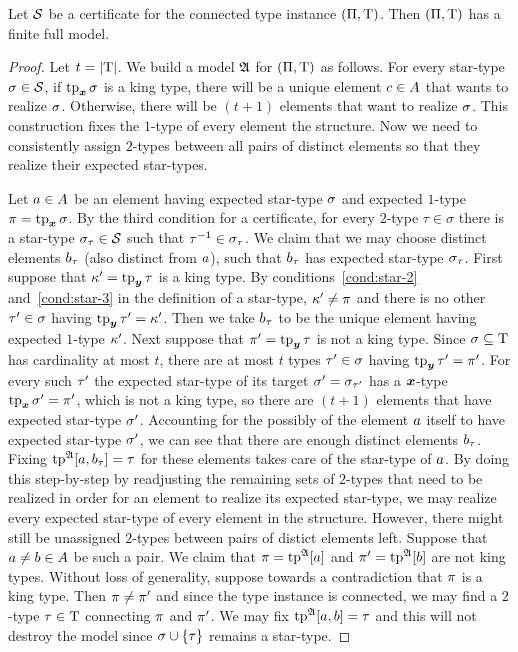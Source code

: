 \begin{lemma}\label{lem:cert-expand}
Let $\mathcal{S}$ be a certificate for the connected type instance $(\Pi,\mathrm{T})$.
Then $(\Pi,\mathrm{T})$ has a finite full model.
\end{lemma}
\begin{proof}
Let $t = \left|\mathrm{T}\right|$.
We build a model $\mathfrak{A}$ for $(\Pi,\mathrm{T})$ as follows. For every star-type
$\sigma \in \mathcal{S}$, if $\operatorname{tp}_{\bm{x}}\sigma$ is a king type, there will be a unique element
$c \in A$ that wants to realize $\sigma$. Otherwise, there will be
$(t+1)$ elements that want to realize $\sigma$.
This construction fixes the $1$-type of every element the structure. 
Now we need to consistently assign $2$-types between all pairs of distinct
elements so that they realize their expected star-types.

Let $a \in A$ be an element having expected star-type $\sigma$ and
expected $1$-type $\pi = \operatorname{tp}_{\bm{x}}\sigma$.
By the third condition for a certificate, for every $2$-type $\tau \in \sigma$
there is a star-type $\sigma_\tau \in \mathcal{S}$ such that $\tau^{-1} \in \sigma_\tau$.
We claim that we may choose distinct elements $b_\tau$ (also distinct from
$a$), such that $b_\tau$ has expected star-type $\sigma_\tau$.
First suppose that ${\kappa'} = \operatorname{tp}_{\bm{y}}\tau$ is a king type.
By conditions~\ref{cond:star-2} and~\ref{cond:star-3} in the definition of a
star-type, ${\kappa'} \neq \pi$ and there is no other ${\tau'} \in \sigma$ having
$\operatorname{tp}_{\bm{y}}{\tau'} = {\kappa'}$. Then we take $b_\tau$ to be the unique element having
expected $1$-type ${\kappa'}$.
Next suppose that ${\pi'} = \operatorname{tp}_{\bm{y}}\tau$ is not a king type.
Since $\sigma \subseteq \mathrm{T}$ has cardinality at most $t$, there are at most $t$
types ${\tau'} \in \sigma$ having $\operatorname{tp}_{\bm{y}}{\tau'} = {\pi'}$.
For every such ${\tau'}$ the expected star-type of its target $\sigma' =
\sigma_{{\tau'}}$ has a $\bm{x}$-type $\operatorname{tp}_{\bm{x}}\sigma' = {\pi'}$, which is not a king
type, so there are $(t+1)$ elements that have expected star-type $\sigma'$.
Accounting for the possibly of the element $a$ itself to have expected
star-type $\sigma'$, we can see that there are enough distinct elements
$b_\tau$. Fixing $\operatorname{tp}^{\mathfrak{A}}[a,b_\tau] = \tau$ for these elements takes
care of the star-type of $a$. By doing this step-by-step by readjusting the
remaining sets of $2$-types that need to be realized in order for an element
to realize its expected star-type, we may realize every expected star-type of
every element in the structure. However, there might still be unassigned
$2$-types between pairs of distict elements left.
Suppose that $a \neq b \in A$ be such a pair. We claim that
$\pi = \operatorname{tp}^{\mathfrak{A}}[a]$ and ${\pi'} = \operatorname{tp}^{\mathfrak{A}}[b]$ are not king types. Without
loss of generality, suppose towards a contradiction that $\pi$ is a king type.
Then $\pi \neq {\pi'}$ and since the type instance is connected, we may find a
$2$-type $\tau \in \mathrm{T}$ connecting $\pi$ and ${\pi'}$.
We may fix $\operatorname{tp}^{\mathfrak{A}}[a,b] = \tau$ and this will not destroy the model since
$\sigma \cup \left\{\tau\right\}$ remains a star-type.
\end{proof}

